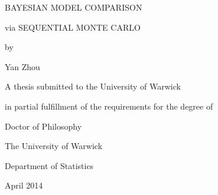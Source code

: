 \begingroup

\thispagestyle{empty}

\fontsize{16}{20}\selectfont

\centering

\begingroup
\vbox{}\baselineskip
\color{MRed}
\allcapt\MakeTextUppercase{Bayesian Model Comparison}\par
\allsmcp via
\allcapt\MakeTextUppercase{Sequential Monte Carlo}\par
\vfill
\allsmcp
by\par
Yan Zhou\par
\endgroup

\vfill\vfill

\begingroup
\fontsize{12}{14}\selectfont
A thesis submitted to the University of Warwick\par
in partial fulfillment of the requirements for the degree of\par
\endgroup

\begingroup
Doctor of Philosophy\par
\endgroup

\vfill

\begingroup
The University of Warwick\par
Department of Statistics\par{}\baselineskip
April 2014\vbox{}
\endgroup

\endgroup
\pagebreak
